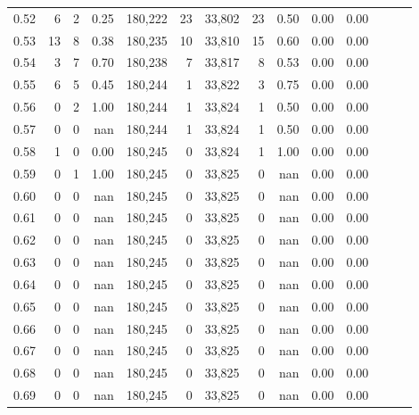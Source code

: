 \begin{tabular}{rrrrrrrrrrrrrr}
0.52 &       6 &      2 &  0.25 &  180,222 &       23 &  33,802 &      23 &  0.50 &  0.00 &      0.00 \\
0.53 &      13 &      8 &  0.38 &  180,235 &       10 &  33,810 &      15 &  0.60 &  0.00 &      0.00 \\
0.54 &       3 &      7 &  0.70 &  180,238 &        7 &  33,817 &       8 &  0.53 &  0.00 &      0.00 \\
0.55 &       6 &      5 &  0.45 &  180,244 &        1 &  33,822 &       3 &  0.75 &  0.00 &      0.00 \\
0.56 &       0 &      2 &  1.00 &  180,244 &        1 &  33,824 &       1 &  0.50 &  0.00 &      0.00 \\
0.57 &       0 &      0 &   nan &  180,244 &        1 &  33,824 &       1 &  0.50 &  0.00 &      0.00 \\
0.58 &       1 &      0 &  0.00 &  180,245 &        0 &  33,824 &       1 &  1.00 &  0.00 &      0.00 \\
0.59 &       0 &      1 &  1.00 &  180,245 &        0 &  33,825 &       0 &   nan &  0.00 &      0.00 \\
0.60 &       0 &      0 &   nan &  180,245 &        0 &  33,825 &       0 &   nan &  0.00 &      0.00 \\
0.61 &       0 &      0 &   nan &  180,245 &        0 &  33,825 &       0 &   nan &  0.00 &      0.00 \\
0.62 &       0 &      0 &   nan &  180,245 &        0 &  33,825 &       0 &   nan &  0.00 &      0.00 \\
0.63 &       0 &      0 &   nan &  180,245 &        0 &  33,825 &       0 &   nan &  0.00 &      0.00 \\
0.64 &       0 &      0 &   nan &  180,245 &        0 &  33,825 &       0 &   nan &  0.00 &      0.00 \\
0.65 &       0 &      0 &   nan &  180,245 &        0 &  33,825 &       0 &   nan &  0.00 &      0.00 \\
0.66 &       0 &      0 &   nan &  180,245 &        0 &  33,825 &       0 &   nan &  0.00 &      0.00 \\
0.67 &       0 &      0 &   nan &  180,245 &        0 &  33,825 &       0 &   nan &  0.00 &      0.00 \\
0.68 &       0 &      0 &   nan &  180,245 &        0 &  33,825 &       0 &   nan &  0.00 &      0.00 \\
0.69 &       0 &      0 &   nan &  180,245 &        0 &  33,825 &       0 &   nan &  0.00 &      0.00 \\

\end{tabular}
